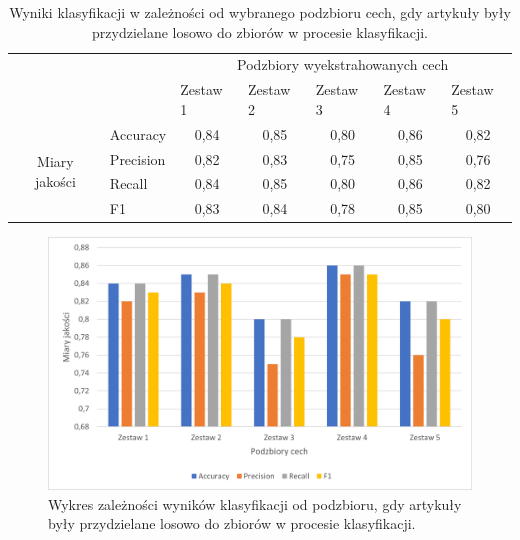 \documentclass{classrep}
\begin{document}
\begin{table}[!htbp]
\caption{Wyniki klasyfikacji w zależności od wybranego podzbioru cech, gdy artykuły były przydzielane losowo do zbiorów w procesie klasyfikacji.}
\centering
\label{table:podzbiory_stale}
\begin{tabular}{cl|c|c|c|c|c|}
\cline{3-7}
\multicolumn{1}{l}{}                                 &           & \multicolumn{5}{c|}{Podzbiory wyekstrahowanych cech}                                                                                                          \\ \cline{3-7} 
\multicolumn{1}{l}{}                                 &           & \multicolumn{1}{l|}{Zestaw 1} & \multicolumn{1}{l|}{Zestaw 2} & \multicolumn{1}{l|}{Zestaw 3} & \multicolumn{1}{l|}{Zestaw 4} & \multicolumn{1}{l|}{Zestaw 5} \\ \hline
\multicolumn{1}{|c|}{\multirow{4}{*}{Miary jakości}} & Accuracy  & 0,84                          & 0,85                          & 0,80                          & 0,86                          & 0,82                          \\ \cline{2-7} 
\multicolumn{1}{|c|}{}                               & Precision & 0,82                          & 0,83                          & 0,75                          & 0,85                          & 0,76                          \\ \cline{2-7} 
\multicolumn{1}{|c|}{}                               & Recall    & 0,84                          & 0,85                          & 0,80                          & 0,86                          & 0,82                          \\ \cline{2-7} 
\multicolumn{1}{|c|}{}                               & F1        & 0,83                          & 0,84                          & 0,78                          & 0,85                          & 0,80                          \\ \hline
\end{tabular}
\end{table}
\begin{figure}[H]
    \centering
    \includegraphics[width=14cm]{features_sets_bar_chart.png}
    \caption{Wykres zależności wyników klasyfikacji od podzbioru, gdy artykuły były przydzielane losowo do zbiorów w procesie klasyfikacji.}
    \label{rysunek:podzbiory}
\end{figure}
\end{document}
